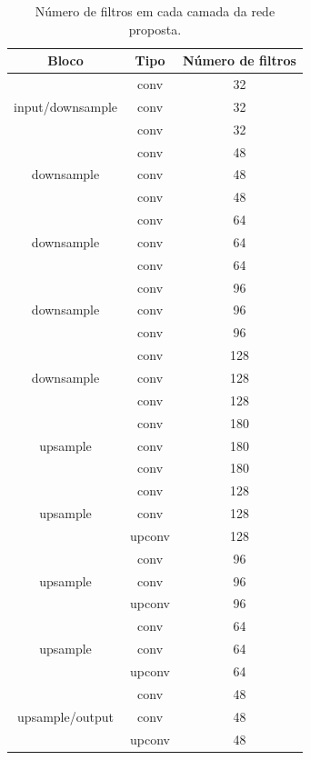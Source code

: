 \documentclass[article]{IEEEtran}
\begin{document}
\begin{table}
\centering
	\small
\label{table:unet}
\caption{Número de filtros em cada camada da rede proposta.}
\begin{tabular}{|c|c|c|}
	\hline
    Bloco & Tipo & Número de filtros\\
    \hline
    & conv & 32\\
    input/downsample & conv & 32\\
    & conv & 32\\
    \hline
    & conv & 48\\
    downsample & conv & 48\\
    & conv & 48\\
    \hline
    & conv & 64\\
    downsample & conv & 64\\
    & conv & 64\\
    \hline
    & conv & 96\\
    downsample & conv & 96\\
    & conv & 96\\
    \hline
    & conv & 128\\
    downsample & conv & 128\\
    & conv & 128\\
    \hline
    & conv & 180\\
    upsample & conv & 180\\
    & conv & 180\\
    \hline
    & conv & 128\\
    upsample & conv & 128\\
    & upconv & 128\\
    \hline
    & conv & 96\\
    upsample & conv & 96\\
    & upconv & 96\\
    \hline
    & conv & 64\\
    upsample & conv & 64\\
    & upconv & 64\\
    \hline
    & conv & 48\\
    upsample/output & conv & 48\\
    & upconv & 48\\
    \hline
\end{tabular}
\end{table}
\end{document}
